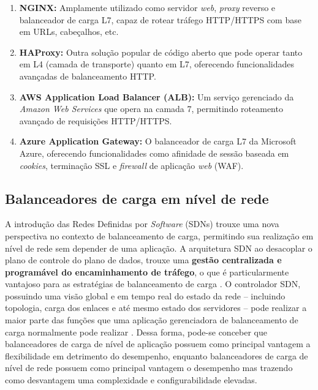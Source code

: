 \begin{enumerate}
    \item \textbf{NGINX:} Amplamente utilizado como servidor \textit{web}, \textit{proxy} reverso e balanceador de carga L7, capaz de rotear tráfego HTTP/HTTPS com base em URLs, cabeçalhos, etc.
    \item \textbf{HAProxy:} Outra solução popular de código aberto que pode operar tanto em L4 (camada de transporte) quanto em L7, oferecendo funcionalidades avançadas de balanceamento HTTP.
    \item \textbf{AWS Application Load Balancer (ALB):} Um serviço gerenciado da \textit{Amazon Web Services} que opera na camada 7, permitindo roteamento avançado de requisições HTTP/HTTPS.
    \item \textbf{Azure Application Gateway:} O balanceador de carga L7 da Microsoft Azure, oferecendo funcionalidades como afinidade de sessão baseada em \textit{cookies}, terminação SSL e \textit{firewall} de aplicação \textit{web} (WAF).
\end{enumerate}

\subsection{Balanceadores de carga em nível de rede}

A introdução das Redes Definidas por \textit{Software} (SDNs) trouxe uma nova perspectiva no contexto de balanceamento de carga, permitindo sua realização em nível de rede sem depender de uma aplicação. A arquitetura SDN ao desacoplar o plano de controle do plano de dados, trouxe uma \textbf{gestão centralizada e programável do encaminhamento de tráfego}, o que é particularmente vantajoso para as estratégias de balanceamento de carga \cite{BelgaumRiyazMusaShahrulnizaAlamMansoorSuudMohd2020}. O controlador SDN, possuindo uma visão global e em tempo real do estado da rede – incluindo topologia, carga dos enlaces e até mesmo estado dos servidores – pode realizar a maior parte das funções que uma aplicação gerenciadora de balanceamento de carga normalmente pode realizar \cite{hamdan2021}. Dessa forma, pode-se conceber que balanceadores de carga de nível de aplicação possuem como principal vantagem a flexibilidade em detrimento do desempenho, enquanto balanceadores de carga de nível de rede possuem como principal vantagem o desempenho mas trazendo como desvantagem uma complexidade e configurabilidade elevadas.

